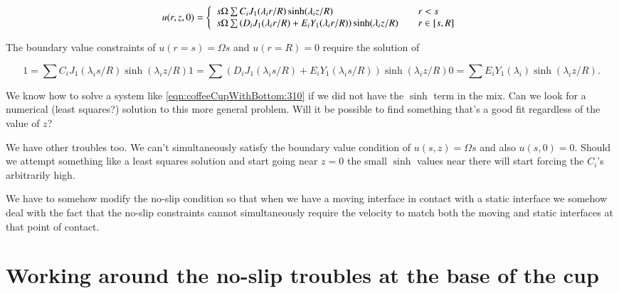 \begin{equation}\label{eqn:coffeeCupWithBottom:230b}
u(r, z, 0) = 
\left\{
\begin{array}{l l}
s \Omega
\sum 
C_i J_1(\lambda_i r/R) \sinh(\lambda_i z/R)
& \quad \mbox{$r < s$} \\
s \Omega
\sum 
\left( D_i J_1(\lambda_i r/R) + E_i Y_1(\lambda_i r/R) \right) \sinh(\lambda_i z/R)
 & \quad \mbox{$r \in [s, R]$} \\
\end{array}
\right.
\end{equation}

The boundary value constraints of $u(r = s) = \Omega s$ and $u(r = R) = 0$ require the solution of

\begin{subequations}
\begin{equation}\label{eqn:coffeeCupWithBottom:310}
1 = \sum C_i J_1(\lambda_i s/R) \sinh(\lambda_i z/R) 
\end{equation}
\begin{equation}\label{eqn:coffeeCupWithBottom:330}
1 = \sum \left( D_i J_1(\lambda_i s/R) + E_i Y_1(\lambda_i s/R) \right) \sinh(\lambda_i z/R)
\end{equation}
\begin{equation}\label{eqn:coffeeCupWithBottom:350}
0 = \sum E_i Y_1(\lambda_i) \sinh(\lambda_i z/R).
\end{equation}
\end{subequations}

We know how to solve a system like \ref{eqn:coffeeCupWithBottom:310} if we did not have the $\sinh$ term in the mix.  Can we look for a numerical (least squares?) solution to this more general problem.  Will it be possible to find something that's a good fit regardless of the value of $z$?

We have other troubles too.  We can't simultaneously satisfy the boundary value condition of $u(s, z) = \Omega s$ and also $u(s, 0) = 0$.  Should we attempt something like a least squares solution and start going near $z = 0$ the small $\sinh$ values near there will start forcing the $C_i$'s arbitrarily high.

We have to somehow modify the no-slip condition so that when we have a moving interface in contact with a static interface we somehow deal with the fact that the no-slip constraints cannot simultaneously require the velocity to match both the moving and static interfaces at that point of contact.

\section{Working around the no-slip troubles at the base of the cup}

